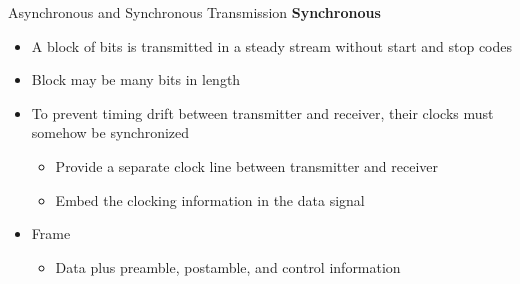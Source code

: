 \documentclass[pdflatex,compress]{beamer}
\begin{document}
\begin{frame}{Asynchronous and Synchronous Transmission}
	\textbf{Synchronous}
	\begin{itemize}
		\item A block of bits is transmitted in a steady stream without start and stop codes
		\item Block may be many bits in length
		\item To prevent timing drift between transmitter and receiver, their clocks must somehow be synchronized
		\begin{itemize}
			\item Provide a separate clock line between transmitter and receiver
			\item Embed the clocking information in the data signal
		\end{itemize}
		\item Frame
		\begin{itemize}
			\item Data plus preamble, postamble, and control information
		\end{itemize}
	\end{itemize}
\end{frame}
\end{document}
